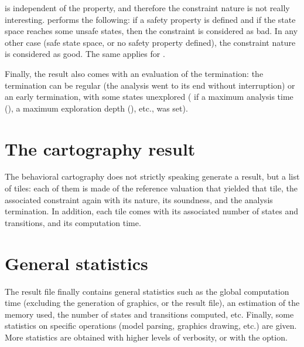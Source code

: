 \begin{remark}
	\IM{} is independent of the property, and therefore the constraint nature is not really interesting.
	\imitator{} performs the following:
	if a safety property is defined and if the state space reaches some unsafe states, then the constraint is considered as bad.
	In any other case (safe state space, or no safety property defined), the constraint nature is considered as good.
	The same applies for \BC{}.
\end{remark}


Finally, the result also comes with an evaluation of the termination: the termination can be regular (the analysis went to its end without interruption) or an early termination, with some states unexplored (\eg{} if a maximum analysis time (), a maximum exploration depth (), etc., was set).


\section{The cartography result}

The behavioral cartography does not strictly speaking generate a result, but a list of tiles: each of them is made of the reference valuation that yielded that tile, the associated constraint again with its nature, its soundness, and the analysis termination.
In addition, each tile comes with its associated number of states and transitions, and its computation time.



\section{General statistics}

The result file finally contains general statistics such as the global computation time (excluding the generation of graphics, or the result file), an estimation of the memory used, the number of states and transitions computed, etc.
Finally, some statistics on specific operations (model parsing, graphics drawing, etc.) are given.
More statistics are obtained with higher levels of verbosity, or with the  option.


